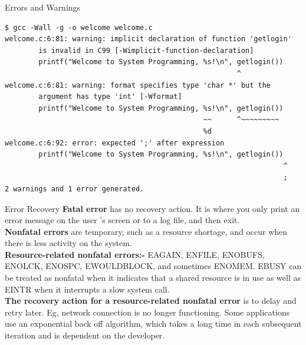 \documentclass[newPxFont,sthlmFooter,nooffset]{beamer}
\begin{document}
\begin{frame}[t,fragile]{Errors and Warnings}
\begin{lstlisting}
$ gcc -Wall -g -o welcome welcome.c
welcome.c:6:81: warning: implicit declaration of function 'getlogin'
        is invalid in C99 [-Wimplicit-function-declaration]
        printf("Welcome to System Programming, %s!\n", getlogin())
                                                       ^
welcome.c:6:81: warning: format specifies type 'char *' but the
        argument has type 'int' [-Wformat]
        printf("Welcome to System Programming, %s!\n", getlogin())
                                               ~~      ^~~~~~~~~~
                                               %d
welcome.c:6:92: error: expected ';' after expression
        printf("Welcome to System Programming, %s!\n", getlogin())
                                                                  ^
                                                                  ;
2 warnings and 1 error generated.
\end{lstlisting}


\end{frame}


\begin{frame}[t]{Error Recovery}
\textbf{Fatal error} has no recovery action. It is where you only print an error message on the user ’s screen or to a log file, and then exit.\\[6pt]
\textbf{Nonfatal errors} are temporary, such as a resource shortage, and occur when there is less activity on the system. \\[6pt]\textbf{Resource-related nonfatal errors:-} EAGAIN, ENFILE, ENOBUFS, ENOLCK, ENOSPC, EWOULDBLOCK, and sometimes ENOMEM. EBUSY can be treated as nonfatal when it indicates that a shared resource is in use as well as EINTR when it interrupts a slow system call.\\[6pt]
\textbf{The recovery action for a resource-related nonfatal error} is to delay and retry later. Eg, network connection is no longer functioning.
Some applications use an exponential back off algorithm, which takes a long time in each subsequent iteration and is dependent on the developer.


\end{frame}
\end{document}
